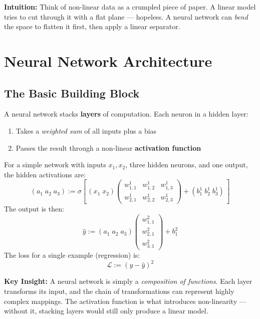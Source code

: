 \documentclass[12pt]{article}
\begin{document}
\begin{takeawaybox}
\textbf{Intuition:} Think of non-linear data as a crumpled piece of paper. A linear model
tries to cut through it with a flat plane --- hopeless. A neural network can \emph{bend}
the space to flatten it first, then apply a linear separator.
\end{takeawaybox}

\section{Neural Network Architecture}

\subsection{The Basic Building Block}

A neural network stacks \textbf{layers} of computation. Each neuron in a hidden layer:
\begin{enumerate}
  \item Takes a \emph{weighted sum} of all inputs plus a bias
  \item Passes the result through a non-linear \textbf{activation function}
\end{enumerate}

For a simple network with inputs $x_1, x_2$, three hidden neurons, and one output, the hidden activations are:
\[
(a_1 \; a_2 \; a_3) := \sigma\!\left[\,(x_1 \; x_2)\begin{pmatrix} w^1_{1,1} & w^1_{1,2} & w^1_{1,3} \\ w^1_{2,1} & w^1_{2,2} & w^1_{2,3} \end{pmatrix} + (b^1_1 \; b^1_2 \; b^1_3)\,\right]
\]
The output is then:
\[
\hat{y} := (a_1 \; a_2 \; a_3)\begin{pmatrix} w^2_{1,1} \\ w^2_{2,1} \\ w^2_{3,1} \end{pmatrix} + b^2_1
\]
The loss for a single example (regression) is:
\[
\mathcal{L} := (y - \hat{y})^2
\]

\begin{notebox}
\textbf{Key Insight:} A neural network is simply a \emph{composition of functions}.
Each layer transforms its input, and the chain of transformations can represent
highly complex mappings. The activation function is what introduces non-linearity ---
without it, stacking layers would still only produce a linear model.
\end{notebox}
\end{document}
